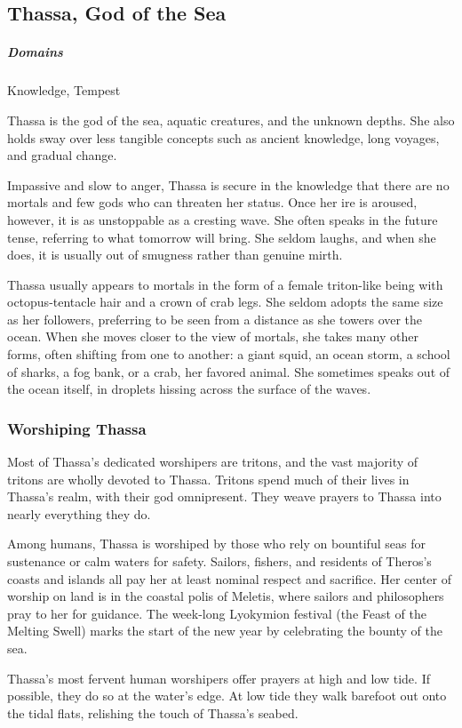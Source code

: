 \subsection*{Thassa, God of the Sea} \label{ssec::thassa}
    \subparagraph{Domains} Knowledge, Tempest

    Thassa is the god of the sea, aquatic creatures, and the unknown depths. She also holds sway over less tangible concepts such as ancient knowledge, long voyages, and gradual change.

    Impassive and slow to anger, Thassa is secure in the knowledge that there are no mortals and few gods who can threaten her status. Once her ire is aroused, however, it is as unstoppable as a cresting wave. She often speaks in the future tense, referring to what tomorrow will bring. She seldom laughs, and when she does, it is usually out of smugness rather than genuine mirth.

    Thassa usually appears to mortals in the form of a female triton-like being with octopus-tentacle hair and a crown of crab legs. She seldom adopts the same size as her followers, preferring to be seen from a distance as she towers over the ocean. When she moves closer to the view of mortals, she takes many other forms, often shifting from one to another: a giant squid, an ocean storm, a school of sharks, a fog bank, or a crab, her favored animal. She sometimes speaks out of the ocean itself, in droplets hissing across the surface of the waves.

    \subsubsection{Worshiping Thassa}
        Most of Thassa's dedicated worshipers are tritons, and the vast majority of tritons are wholly devoted to Thassa. Tritons spend much of their lives in Thassa's realm, with their god omnipresent. They weave prayers to Thassa into nearly everything they do.

        Among humans, Thassa is worshiped by those who rely on bountiful seas for sustenance or calm waters for safety. Sailors, fishers, and residents of Theros's coasts and islands all pay her at least nominal respect and sacrifice. Her center of worship on land is in the coastal polis of Meletis, where sailors and philosophers pray to her for guidance. The week-long Lyokymion festival (the Feast of the Melting Swell) marks the start of the new year by celebrating the bounty of the sea.

        Thassa's most fervent human worshipers offer prayers at high and low tide. If possible, they do so at the water's edge. At low tide they walk barefoot out onto the tidal flats, relishing the touch of Thassa's seabed.
